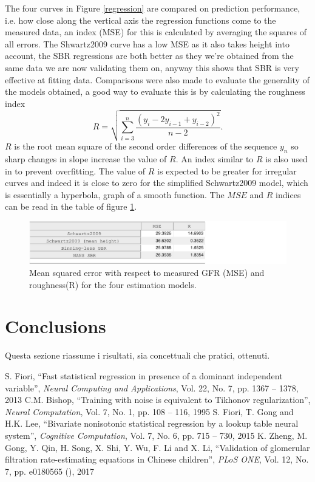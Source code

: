 \documentclass[10pt,final]{siamltex}
\begin{document}
The four curves in Figure \ref{regression} are compared on prediction performance, i.e. how close along the vertical axis the regression functions come to the measured data, an index (MSE) for this is calculated by averaging the squares of all errors. The Shwartz2009 curve has a low MSE as it also takes height into account, the SBR regressions are both better as they we're obtained from the same data we are now validating them on, anyway this shows that SBR is very effective at fitting data.
Comparisons were also made to evaluate the generality of the models obtained, a good way to evaluate this is by calculating the roughness index
$$ R = \sqrt{\sum_{i=3}^{n}{\frac{(y_i-2y_{i-1}+y_{i-2})^2}{n-2}}}.$$
$R$ is the root mean square of the second order differences of the sequence $y_n$ so sharp changes in slope increase the value of $R$. An index similar to $R$ is also used in \cite{bishop} to prevent overfitting.
The value of $R$ is expected to be greater for irregular curves and indeed it is close to zero for the simplified Schwartz2009 model, which is essentially a hyperbola, graph of a smooth function.
The $MSE$ and $R$ indices can be read in the table of figure \ref{table}.

\begin{figure}[ht]
  \centering
  \includegraphics[scale=0.6]{figures/table}
  \caption{Mean squared error with respect to measured GFR (MSE) and roughness(R) for the four estimation models. }
  \label{table}
\end{figure}

\section{Conclusions}\label{sec4}
%
{{\red Questa sezione riassume i risultati, sia concettuali che pratici, ottenuti.}}
%
\begin{thebibliography}{99}
   S. Fiori, ``Fast statistical regression in presence of a dominant independent variable'', \textit{Neural Computing and Applications}, Vol. 22, No. 7, pp. 1367 -- 1378, 2013
   C.M. Bishop, ``Training with noise is equivalent to Tikhonov regularization'', \textit{Neural Computation}, Vol. 7, No. 1, pp. 108 -- 116, 1995
   S. Fiori, T. Gong and H.K. Lee, ``Bivariate nonisotonic statistical regression by a lookup table neural system'', \textit{Cognitive Computation}, Vol. 7, No. 6, pp. 715 -- 730, 2015
   K. Zheng, M. Gong, Y. Qin, H. Song, X. Shi, Y. Wu, F. Li and X. Li, ``Validation of glomerular filtration rate-estimating equations in Chinese children'', \textit{PLoS ONE}, Vol. 12, No. 7, pp. e0180565 (), 2017
\end{thebibliography}
\end{document}
